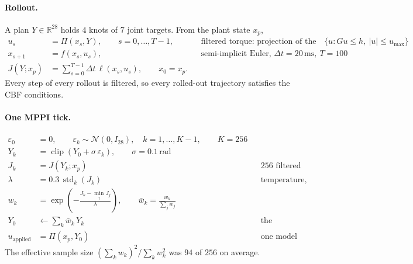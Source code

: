 
\paragraph{Rollout.}
A plan $Y \in \mathbb{R}^{28}$ holds $4$ knots of $7$ joint targets. From the plant state $x_p$,
\begin{align}
  u_s     &= \Pi\!\left(x_s, Y\right), \qquad s = 0,\dots,T-1,
           && \text{filtered torque: projection of the PD torque onto } \{u : G u \le h,\ |u| \le u_{\max}\} \\
  x_{s+1} &= f(x_s, u_s), && \text{semi-implicit Euler, } \Delta t = 20\,\mathrm{ms},\ T = 100 \\
  J(Y; x_p) &= \sum_{s=0}^{T-1} \Delta t\, \ell(x_s, u_s), \qquad x_0 = x_p .
\end{align}
Every step of every rollout is filtered, so every rolled-out trajectory satisfies the CBF conditions.

\paragraph{One MPPI tick.}
\begin{align}
  \varepsilon_0 &= 0, \qquad \varepsilon_k \sim \mathcal{N}(0, I_{28}), \quad k = 1,\dots,K-1, \qquad K = 256 \\
  Y_k &= \operatorname{clip}\!\left(Y_0 + \sigma\,\varepsilon_k\right), \qquad \sigma = 0.1\,\mathrm{rad} \\
  J_k &= J(Y_k; x_p) && \text{256 filtered rollouts in parallel} \\
  \lambda &= 0.3\, \operatorname{std}_k(J_k) && \text{temperature, rescaled every tick} \\
  w_k &= \exp\!\left(-\frac{J_k - \min_j J_j}{\lambda}\right), \qquad
  \bar w_k = \frac{w_k}{\sum_j w_j} \\
  Y_0 &\leftarrow \sum_{k} \bar w_k\, Y_k && \text{the averaging step (plans, not torques)} \\
  u_{\mathrm{applied}} &= \Pi\!\left(x_p, Y_0\right) && \text{one model evaluation and one projection, not a rollout}
\end{align}
The effective sample size $(\sum_k w_k)^2 / \sum_k w_k^2$ was $94$ of $256$ on average.

